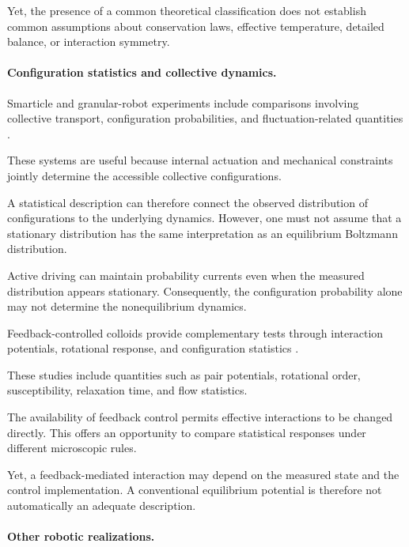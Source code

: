 Yet, the presence of a common
theoretical classification does
not establish common assumptions
about conservation laws,
effective temperature,
detailed balance,
or interaction symmetry.

\paragraph*{Configuration statistics and collective dynamics.}

Smarticle and granular-robot
experiments include comparisons
involving collective transport,
configuration probabilities,
and fluctuation-related
quantities
\cite{Li2018supersmarticlealo,Chvykov2020lowrattlingapred,Li2020programmingactiveg}.

These systems are useful
because internal actuation
and mechanical constraints
jointly determine the
accessible collective
configurations.

A statistical description
can therefore connect
the observed distribution
of configurations to
the underlying dynamics.
However, one must not
assume that a stationary
distribution has the
same interpretation
as an equilibrium
Boltzmann distribution.

Active driving can
maintain probability
currents even when
the measured distribution
appears stationary.
Consequently, the
configuration probability
alone may not determine
the nonequilibrium
dynamics.

Feedback-controlled
colloids provide
complementary tests
through interaction
potentials, rotational
response, and
configuration statistics
\cite{Yan2014colloidalsuperstruc,Buerle2020formationofstable,Knippenberg2022roleofcohesionin,Lffler2021behaviordependentc}.

These studies include
quantities such as
pair potentials,
rotational order,
susceptibility,
relaxation time,
and flow statistics.

The availability
of feedback control
permits effective
interactions to
be changed directly.
This offers an
opportunity to
compare statistical
responses under
different microscopic
rules.

Yet, a feedback-mediated
interaction may depend
on the measured state
and the control
implementation.
A conventional
equilibrium potential
is therefore not
automatically an
adequate description.

\paragraph*{Other robotic realizations.}

